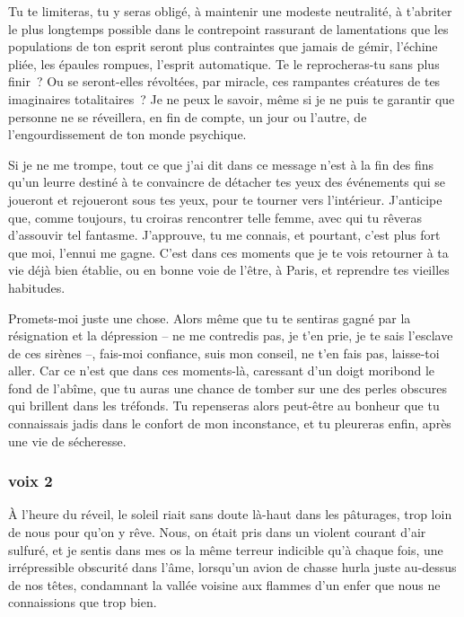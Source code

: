 \documentclass[
  extrafontsizes,
  oneside,
  14pt
]{memoir}
\begin{document}
Tu te limiteras, tu y seras obligé, à maintenir une modeste neutralité, à
t'abriter le plus longtemps possible dans le contrepoint rassurant de
lamentations que les populations de ton esprit seront plus contraintes que
jamais de gémir, l'échine pliée, les épaules rompues, l'esprit automatique. Te
le reprocheras-tu sans plus finir~? Ou se seront-elles révoltées, par miracle,
ces rampantes créatures de tes imaginaires totalitaires~? Je ne peux le savoir,
même si je ne puis te garantir que personne ne se réveillera, en fin de compte,
un jour ou l'autre, de l'engourdissement de ton monde psychique.

Si je ne me trompe, tout ce que j'ai dit dans ce message n'est à la fin des
fins qu'un leurre destiné à te convaincre de détacher tes yeux des événements
qui se joueront et rejoueront sous tes yeux, pour te tourner vers l'intérieur.
J'anticipe que, comme toujours, tu croiras rencontrer telle femme, avec qui tu
rêveras d'assouvir tel fantasme. J'approuve, tu me connais, et pourtant, c'est
plus fort que moi, l'ennui me gagne. C'est dans ces moments que je te vois
retourner à ta vie déjà bien établie, ou en bonne voie de l'être, à Paris, et
reprendre tes vieilles habitudes.

Promets-moi juste une chose. Alors même que tu te sentiras gagné par la
résignation et la dépression -- ne me contredis pas, je t'en prie, je te sais
l'esclave de ces sirènes --, fais-moi confiance, suis mon conseil, ne t'en fais
pas, laisse-toi aller. Car ce n'est que dans ces moments-là, caressant d'un
doigt moribond le fond de l'abîme, que tu auras une chance de tomber sur une
des perles obscures qui brillent dans les tréfonds. Tu repenseras alors
peut-être au bonheur que tu connaissais jadis dans le confort de mon
inconstance, et tu pleureras enfin, après une vie de sécheresse.

\newpage

\subsubsection{voix 2}\label{voix-2}

À l'heure du réveil, le soleil riait sans doute là-haut dans les pâturages,
trop loin de nous pour qu'on y rêve. Nous, on était pris dans un violent
courant d'air sulfuré, et je sentis dans mes os la même terreur indicible qu'à
chaque fois, une irrépressible obscurité dans l'âme, lorsqu'un avion de chasse
hurla juste au-dessus de nos têtes, condamnant la vallée voisine aux flammes
d'un enfer que nous ne connaissions que trop bien.
\end{document}
